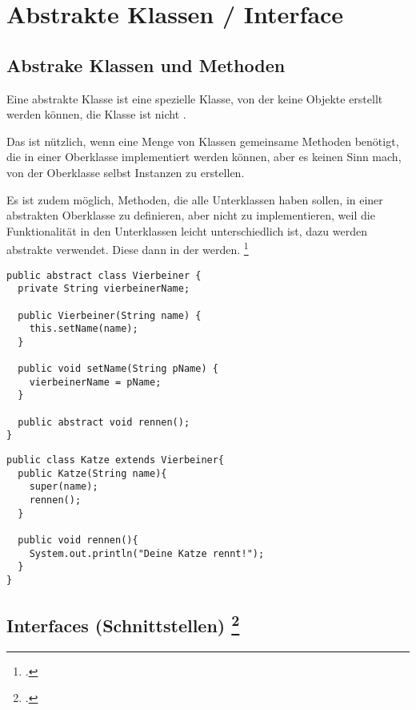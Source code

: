 \documentclass{bschlangaul-theorie}
\begin{document}
\chapter{Abstrakte Klassen / Interface}

\cite[Vererbung Seite 28-31 (PDF Seite 156-159)]{brinda}

\section{Abstrake Klassen und Methoden}

Eine abstrakte Klasse ist eine spezielle Klasse, von der keine Objekte
erstellt werden können, \dh die Klasse ist nicht .

Das ist nützlich, wenn eine Menge von Klassen gemeinsame Methoden
benötigt, die in einer Oberklasse implementiert werden können, aber es
keinen Sinn mach, von der Oberklasse selbst Instanzen zu erstellen.

Es ist zudem möglich, Methoden, die alle Unterklassen haben sollen, in
einer abstrakten Oberklasse zu definieren, aber nicht zu implementieren,
weil die Funktionalität in den Unterklassen leicht unterschiedlich ist,
dazu werden abstrakte  verwendet. Diese 
dann in der  werden.
\footcite[Seite 31]{oomup:fs:3}

\begin{verbatim}
public abstract class Vierbeiner {
  private String vierbeinerName;

  public Vierbeiner(String name) {
    this.setName(name);
  }

  public void setName(String pName) {
    vierbeinerName = pName;
  }

  public abstract void rennen();
}
\end{verbatim}

\begin{verbatim}
public class Katze extends Vierbeiner{
  public Katze(String name){
    super(name);
    rennen();
  }

  public void rennen(){
    System.out.println("Deine Katze rennt!");
  }
}
\end{verbatim}

\section{Interfaces (Schnittstellen)
\footcite[Vererbung Seite 32-38 (PDF Seite 160-166)]{brinda}}
\end{document}
